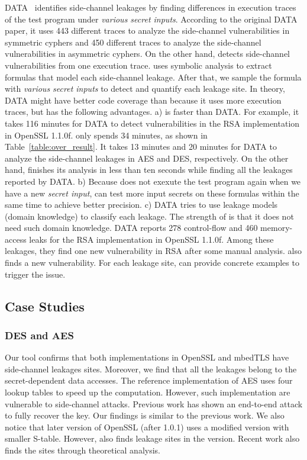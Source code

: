 DATA~\cite{217537} identifies
side-channel leakages by finding differences in execution traces of
the test program under \emph{various secret inputs}. According to
the original DATA paper, it uses 443 different traces to analyze the
side-channel vulnerabilities in symmetric cyphers and 450 different
traces to analyze the side-channel vulnerabilities in asymmetric
cyphers. On the other hand, \detect{} detects side-channel
vulnerabilities from one execution trace. \detect{} uses symbolic
analysis to extract formulas that model each side-channel
leakage. After that, we sample the formula with \emph{various
  secret inputs} to detect and quantify each leakage site. In
theory, DATA might have better code coverage than \detect{} because it
uses more execution traces,  but \detect{} has the following
advantages. a) \detect{} is faster than DATA. For example, it takes
116 minutes for DATA to detect vulnerabilities in the RSA implementation in OpenSSL 1.1.0f\@. \detect{} only spends 34 minutes, as shown in Table~\ref{table:over_result}. It takes 13 minutes and 20 minutes
for DATA to analyze the side-channel leakages in AES and DES,
respectively. On the other hand, \detect{} finishes its analysis in
less than ten seconds while finding all the leakages reported by
DATA. b) Because \detect{} does not exexute the test program again when we
have a new \emph{secret input}, \detect{} can test more input secrets
on these formulas within the same time to achieve better precision.
c) DATA tries to use leakage models (domain knowledge) to classify each leakage.
The strength of \ctool{} is that it does not need such domain knowledge.
DATA reports 278 control-flow and 460 memory-access leaks for the RSA implementation in OpenSSL 1.1.0f. Among these leakages, they find one new vulnerability in RSA after some manual analysis.
\detect{} also finds a new vulnerability.  For each leakage site, \detect{} can provide
concrete examples to trigger the issue.
\subsection{Case Studies}
\subsubsection{DES and AES}
Our tool confirms that both implementations in OpenSSL and mbedTLS have side-channel leakages
sites. Moreover, we find that all the leakages belong to the secret-dependent data accesses. The reference implementation of AES uses four lookup tables to speed up the computation. However, such implementation are vulnerable to side-channel attacks. Previous work has shown an end-to-end attack to fully recover the key. Our findings is similar to the previous work. We also notice that later version of OpenSSL (after 1.0.1) uses a modified version with smaller S-table. However, \detect{} also finds leakage sites in the version. Recent work also finds the sites through theoretical analysis.

